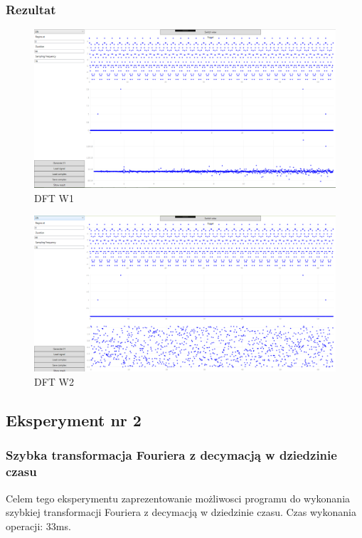 \documentclass[12pt]{article}
\begin{document}
\subsubsection{Rezultat}
\begin{figure}[H]
 \centering
 \includegraphics[width=14cm]{images/dftw1.PNG}
 \vspace{-0.3cm}
 \caption{DFT W1}
 \label{gui}
\end{figure}
\begin{figure}[H]
 \centering
 \includegraphics[width=14cm]{images/dftw2.PNG}
 \vspace{-0.3cm}
 \caption{DFT W2}
 \label{gui}
\end{figure}


\subsection{Eksperyment nr 2 }
\subsubsection{Szybka transformacja Fouriera  z decymacją w dziedzinie czasu}
Celem tego eksperymentu zaprezentowanie możliwosci programu do wykonania szybkiej transformacji Fouriera z decymacją w dziedzinie czasu.
Czas wykonania operacji: 33ms.
\end{document}

